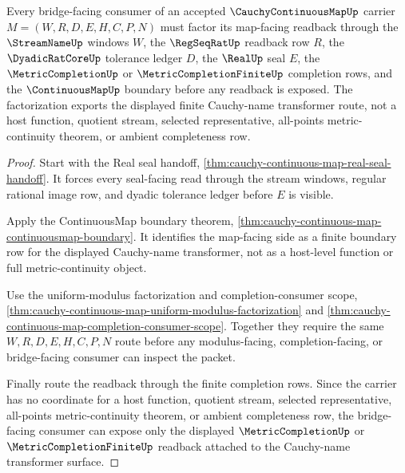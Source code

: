 \begin{theorem}
\label{thm:cauchy-continuous-map-bridge-readback-factorization}
Every bridge-facing consumer of an accepted $\CauchyContinuousMapUp$ carrier $M=(W,R,D,E,H,C,P,N)$ must factor its map-facing readback through the $\StreamNameUp$ windows $W$, the $\RegSeqRatUp$ readback row $R$, the $\DyadicRatCoreUp$ tolerance ledger $D$, the $\RealUp$ seal $E$, the $\MetricCompletionUp$ or $\MetricCompletionFiniteUp$ completion rows, and the $\ContinuousMapUp$ boundary before any readback is exposed. The factorization exports the displayed finite Cauchy-name transformer route, not a host function, quotient stream, selected representative, all-points metric-continuity theorem, or ambient completeness row.
\end{theorem}
\begin{proof}
Start with the Real seal handoff, \autoref{thm:cauchy-continuous-map-real-seal-handoff}. It forces every seal-facing read through the stream windows, regular rational image row, and dyadic tolerance ledger before $E$ is visible.

Apply the ContinuousMap boundary theorem, \autoref{thm:cauchy-continuous-map-continuousmap-boundary}. It identifies the map-facing side as a finite boundary row for the displayed Cauchy-name transformer, not as a host-level function or full metric-continuity object.

Use the uniform-modulus factorization and completion-consumer scope, \autoref{thm:cauchy-continuous-map-uniform-modulus-factorization} and \autoref{thm:cauchy-continuous-map-completion-consumer-scope}. Together they require the same $W,R,D,E,H,C,P,N$ route before any modulus-facing, completion-facing, or bridge-facing consumer can inspect the packet.

Finally route the readback through the finite completion rows. Since the carrier has no coordinate for a host function, quotient stream, selected representative, all-points metric-continuity theorem, or ambient completeness row, the bridge-facing consumer can expose only the displayed $\MetricCompletionUp$ or $\MetricCompletionFiniteUp$ readback attached to the Cauchy-name transformer surface.
\end{proof}

